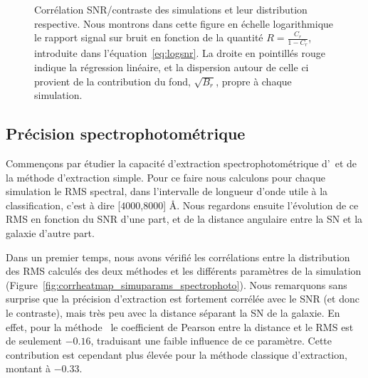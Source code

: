 \documentclass[../main/main.tex]{subfiles}
\begin{document}
\begin{figure}[ht]
  \centering
  \caption[Corrélation SNR/contraste des simulations.]{Corrélation
    SNR/contraste des simulations et leur distribution respective. Nous
    montrons dans cette figure en échelle logarithmique le rapport signal
    sur bruit en fonction de la quantité $R=\frac{C_{r}}{1-C_{r}}$,
    introduite dans l'équation~\ref{eq:logsnr}. La
    droite en pointillés rouge indique la régression
    linéaire, et la dispersion autour de celle ci provient de la
    contribution du fond, $\sqrt{B_{r}}$, propre à chaque simulation.}
  \label{fig:corr_SNR_contrast}
\end{figure}

\subsection{Précision spectrophotométrique}\label{ssec:spectrophotoaccuracy}

Commençons par étudier la capacité d'extraction spectrophotométrique d'\hypergal\ et de la méthode
d'extraction simple. Pour ce faire nous calculons pour chaque simulation
le RMS spectral, dans l'intervalle de longueur d'onde utile à la
classification, c'est à dire [$4000$,$8000$] \AA. Nous regardons ensuite
l'évolution de ce RMS en fonction du SNR d'une part, et de la distance
angulaire entre la SN et la galaxie d'autre part.

Dans un premier temps, nous avons vérifié les corrélations entre la
distribution des RMS calculés des deux méthodes et les différents
paramètres de la simulation
(Figure~\ref{fig:corrheatmap_simuparams_spectrophoto}). Nous remarquons
sans surprise
que la précision d'extraction est fortement corrélée avec le SNR (et
donc le contraste), mais très peu avec la distance séparant la SN de la
galaxie. En effet, pour la méthode \hypergal\ le coefficient de Pearson
entre la distance et le RMS est de seulement $-0.16$, traduisant une
faible influence de ce paramètre. Cette contribution est cependant plus
élevée pour la méthode classique d'extraction, montant à $-0.33$.
\end{document}
